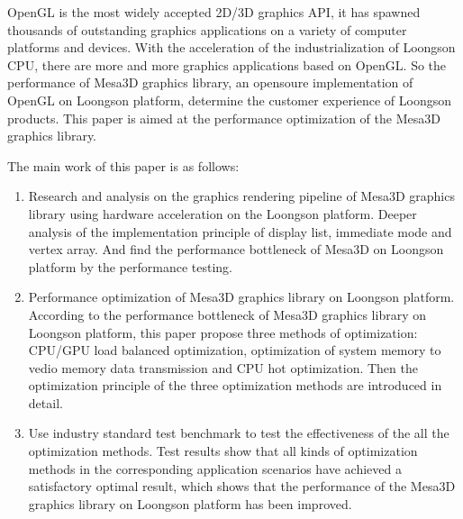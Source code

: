 
\begin{eabstract} 

OpenGL is the most widely accepted 2D/3D graphics API, it has spawned thousands of outstanding graphics applications on a variety of computer platforms and devices. With the acceleration of the industrialization of Loongson CPU, there are more and more graphics applications based on OpenGL. So the performance of Mesa3D graphics library, an opensoure implementation of OpenGL on Loongson platform, determine the customer experience of Loongson products. This paper is aimed at the performance optimization of the Mesa3D graphics library.

The main work of this paper is as follows:

\begin{enumerate}[1]
\item Research and analysis on the graphics rendering pipeline of Mesa3D graphics library using hardware acceleration on the Loongson platform. Deeper analysis of the implementation principle of display list, immediate mode and vertex array. And find the performance bottleneck of Mesa3D on Loongson platform by the performance testing.

\item Performance optimization of Mesa3D graphics library on Loongson platform. According to the performance bottleneck of Mesa3D graphics library on Loongson platform, this paper propose three methods of optimization: CPU/GPU load balanced optimization, optimization of system memory to vedio memory data transmission and CPU hot optimization. Then the optimization principle of the three optimization methods are introduced in detail.

\item Use industry standard test benchmark to test the effectiveness of the all the optimization methods. Test results show that all kinds of optimization methods in the corresponding application scenarios have achieved a satisfactory optimal result, which shows that the performance of the Mesa3D graphics library on Loongson platform has been improved.

\end{enumerate}

\end{eabstract}


